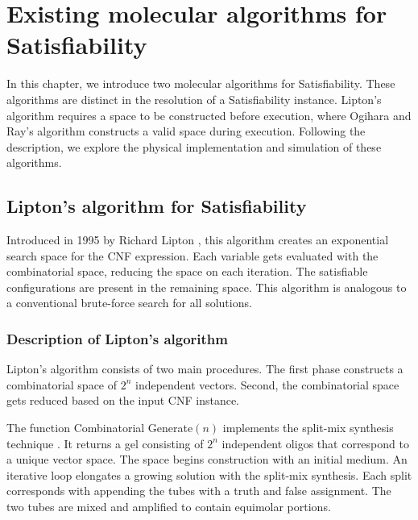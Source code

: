 \chapter{Existing molecular algorithms for {\sc Satisfiability}}


In this chapter, we introduce two molecular algorithms for {\sc Satisfiability}.  These algorithms are distinct in the resolution of a {\sc Satisfiability} instance.  Lipton's algorithm requires a space to be constructed before execution, where Ogihara and Ray's algorithm constructs a valid space during execution.  Following the description, we explore the physical implementation and simulation of these algorithms.
\section{Lipton's algorithm for {\sc Satisfiability}}

Introduced in 1995 by Richard Lipton \cite{Lipton95usingdna}, this algorithm creates an exponential search space for the CNF expression.  Each variable gets evaluated with the combinatorial space, reducing the space on each iteration.  The satisfiable configurations are present in the remaining space.  This algorithm is analogous to a conventional brute-force search for all solutions. 	
	\subsection{Description of Lipton's algorithm}
		
Lipton's algorithm consists of two main procedures.  The first phase constructs a combinatorial space of $2^n$ independent vectors.  Second, the combinatorial space gets reduced based on the input CNF instance. 		

The function {\sc Combinatorial Generate}$(n)$ implements the split-mix synthesis technique \cite{furka1982, furkaBook}.  It returns a gel consisting of $2^n$ independent oligos that correspond to a unique vector space.  The space begins construction with an initial medium.  An iterative loop elongates a growing solution with the split-mix synthesis.  Each split corresponds with appending the tubes with a truth and false assignment.  The two tubes are mixed and amplified to contain equimolar portions.  

